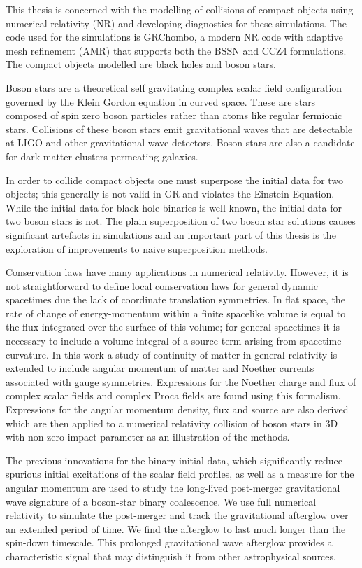 \documentclass[11pt]{report}  %
\numberwithin{equation}{section}
\begin{document}
This thesis is concerned with the modelling of collisions of compact objects using numerical relativity (NR) and developing diagnostics for these simulations. The code used for the simulations is GRChombo, a modern NR code with adaptive mesh refinement (AMR) that supports both the BSSN and CCZ4 formulations. The compact objects modelled are black holes and boson stars.

Boson stars are a theoretical self gravitating complex scalar field configuration governed by the Klein Gordon equation in curved space. These are stars composed of spin zero boson particles rather than atoms like regular fermionic stars. Collisions of these boson stars emit gravitational waves that are detectable at LIGO and other gravitational wave detectors. Boson stars are also a candidate for dark matter clusters permeating galaxies.

In order to collide compact objects one must superpose the initial data for two objects; this generally is not valid in GR and violates the Einstein Equation. While the initial data for black-hole binaries is well known, the initial data for two boson stars is not. The plain superposition of two boson star solutions causes significant artefacts in simulations and an important part of this thesis is the exploration of improvements to naive superposition methods.

Conservation laws have many applications in numerical relativity. However, it is not straightforward to define local conservation laws for general dynamic spacetimes due the lack of coordinate translation symmetries. In flat space, the rate of change of energy-momentum within a finite spacelike volume is equal to the flux integrated over the surface of this volume; for general spacetimes it is necessary to include a volume integral of a source term arising from spacetime curvature. In this work a study of continuity of matter in general relativity is extended to include angular momentum of matter and Noether currents associated with gauge symmetries. Expressions for the Noether charge and flux of complex scalar fields and complex Proca fields are found using this formalism. Expressions for the angular momentum density, flux and source are also derived which are then applied to a numerical relativity collision of boson stars in 3D with non-zero impact parameter as an illustration of the methods.

The previous innovations for the binary initial data, which significantly reduce spurious initial excitations of the scalar field profiles, as well as a measure for the angular momentum are used to study the long-lived post-merger gravitational wave signature of a boson-star binary coalescence. We use full numerical relativity to simulate the post-merger and track the gravitational afterglow over an extended period of time. We find the afterglow to last much longer than the spin-down timescale. This prolonged gravitational wave afterglow provides a characteristic signal that may distinguish it from other astrophysical sources.
\end{document}
